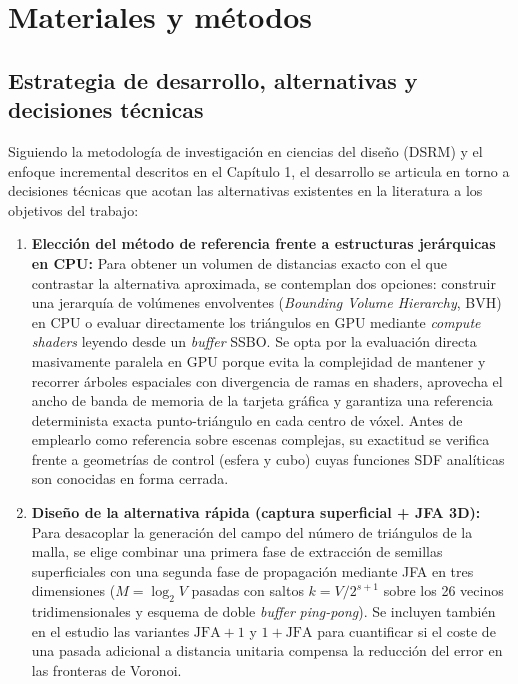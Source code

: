 \clearpage
\section{Materiales y métodos}

\subsection{Estrategia de desarrollo, alternativas y decisiones técnicas}

Siguiendo la metodología de investigación en ciencias del diseño (DSRM) \cite{peffers2007} y el enfoque incremental descritos en el Capítulo 1, el desarrollo se articula en torno a decisiones técnicas que acotan las alternativas existentes en la literatura a los objetivos del trabajo:

\begin{enumerate}
  \item \textbf{Elección del método de referencia frente a estructuras jerárquicas en CPU:} Para obtener un volumen de distancias exacto con el que contrastar la alternativa aproximada, se contemplan dos opciones: construir una jerarquía de volúmenes envolventes (\textit{Bounding Volume Hierarchy}, BVH) en CPU o evaluar directamente los triángulos en GPU mediante \textit{compute shaders} leyendo desde un \textit{buffer} SSBO. Se opta por la evaluación directa masivamente paralela en GPU porque evita la complejidad de mantener y recorrer árboles espaciales con divergencia de ramas en shaders, aprovecha el ancho de banda de memoria de la tarjeta gráfica y garantiza una referencia determinista exacta punto-triángulo en cada centro de vóxel. Antes de emplearlo como referencia sobre escenas complejas, su exactitud se verifica frente a geometrías de control (esfera y cubo) cuyas funciones SDF analíticas son conocidas en forma cerrada.
  \item \textbf{Diseño de la alternativa rápida (captura superficial + JFA 3D):} Para desacoplar la generación del campo del número de triángulos de la malla, se elige combinar una primera fase de extracción de semillas superficiales con una segunda fase de propagación mediante JFA en tres dimensiones ($M = \log_2 V$ pasadas con saltos $k = V / 2^{s+1}$ sobre los 26 vecinos tridimensionales y esquema de doble \textit{buffer} \textit{ping-pong}). Se incluyen también en el estudio las variantes $\text{JFA}+1$ y $1+\text{JFA}$ \cite{rong2006} para cuantificar si el coste de una pasada adicional a distancia unitaria compensa la reducción del error en las fronteras de Voronoi.

\end{enumerate}
